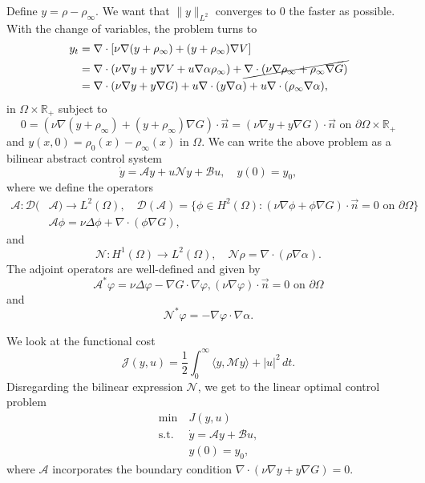 \documentclass[12pt]{article}
\newcommand{\R}{\mathbb{R}}
\newcommand{\N}{\mathcal{N}}
\newcommand{\A}{\mathcal{A}}
\newcommand{\B}{\mathcal{B}}
\newcommand{\n}{\vec{n}}
\newcommand{\steady}{\rho_{\infty}}
\theoremstyle{definition}
\begin{document}
Define $y = \rho - \steady$. 
We want that $\|y\|_{L^2}$ converges to $0$ the faster as possible. 
With the change of variables, the problem turns to
\[
\begin{split}
    y_t &= \nabla \cdot \left[\nu \nabla (y + \steady) + (y + \steady) \nabla V\right] \\
    &= \nabla \cdot \left(\nu \nabla y + y \nabla V + u\nabla \alpha \steady\right) + \cancel{\nabla \cdot (\nu \nabla \steady + \steady \nabla G)} \\
    &= \nabla \cdot (\nu \nabla y + y \nabla G) + u \nabla \cdot (y \nabla \alpha) + u \nabla \cdot (\steady \nabla \alpha),
\end{split}
\]
in $\Omega \times \R_+$ subject to 
\[
0 = (\nu \nabla (y + \steady) + (y + \steady)\nabla G) \cdot \n = (\nu \nabla y + y\nabla G) \cdot \n \text{ on } \partial \Omega \times \R_+
\]
and $y(x,0) = \rho_0(x) - \steady(x)$ in $\Omega$.
We can write the above problem as a bilinear abstract control system 
\[
\dot{y} = \mathcal{A} y + u\mathcal{N}y + \mathcal{B} u, \quad y(0) = y_0,
\]
where we define the operators 
\[
\begin{split}
    \mathcal{A} : \mathcal{D}(&\mathcal{A}) \to L^2(\Omega), \quad \mathcal{D}(\mathcal{A}) = \{\phi \in H^2(\Omega) : (\nu \nabla \phi + \phi \nabla G) \cdot \n = 0 \text{ on } \partial \Omega\} \\
    &\mathcal{A} \phi = \nu \Delta \phi + \nabla \cdot (\phi \nabla G),   
\end{split}
\]
and
\[
\mathcal{N} : H^1(\Omega) \to L^2(\Omega), \quad \mathcal{N}\rho = \nabla \cdot (\rho \nabla \alpha).    
\]
The adjoint operators are well-defined and given by 
\[
\mathcal{A}^*\varphi = \nu \Delta \varphi - \nabla G \cdot \nabla \varphi, (\nu \nabla \varphi) \cdot \n = 0 \text{ on } \partial \Omega    
\]
and 
\[
\mathcal{N}^* \varphi = - \nabla \varphi \cdot  \nabla \alpha. 
\]

We look at the functional cost
\[
\mathcal{J}(y, u) = \frac{1}{2}\int_0^{\infty} \langle y, \mathcal{M} y \rangle + |u|^2 \, dt.
\]
Disregarding the bilinear expression $\N$, we get to the linear optimal control problem
\begin{align}
    \label{eq:optimal-control-problem}
    \min~ &J(y,u) \\
    \text{s.t. } &\dot{y} = \A y + \B u, \\
    &y(0) = y_0,
\end{align}
where $\A$ incorporates the boundary condition $\nabla \cdot (\nu \nabla y + y \nabla G) = 0$.
\end{document}
